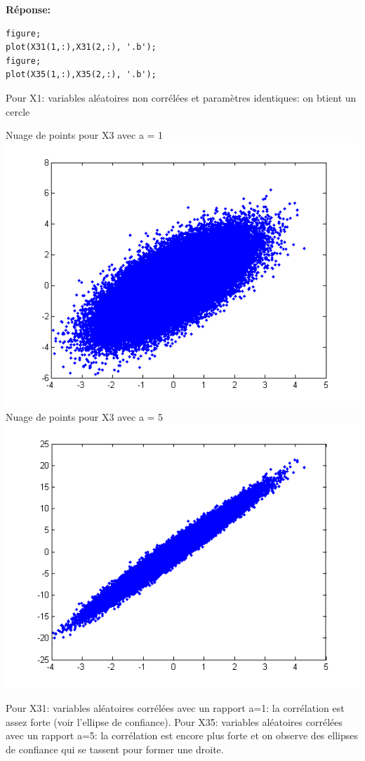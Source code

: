 \documentclass[12pt]{article}
\begin{document}
\smallbreak
\textbf{Réponse:}
\begin{lstlisting}[style=Matlab-editor]
figure;
plot(X31(1,:),X31(2,:), '.b');
figure;
plot(X35(1,:),X35(2,:), '.b');
\end{lstlisting}
Pour X1: variables aléatoires non corrélées et paramètres identiques: on btient un cercle
\smallbreak

\begin{flushleft}
Nuage de points pour X3 avec a = 1
\includegraphics{2_9_A1.PNG}
\clearpage
Nuage de points pour X3 avec a = 5
\includegraphics{2_9_A5.PNG}
\end{flushleft}

Pour X31: variables aléatoires corrélées avec un rapport a=1: la corrélation est assez forte (voir l'ellipse de confiance). 
Pour X35: variables aléatoires corrélées avec un rapport a=5: la corrélation est encore plus forte et on observe des ellipses de confiance qui se tassent pour former une droite.
\end{document}
